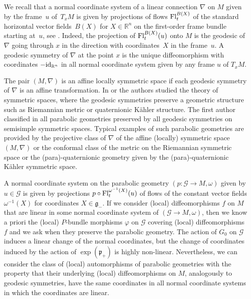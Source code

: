 \documentclass[pdftex]{sigma}
\newcommand{\om}{\omega}
\newcommand{\ba}{\mathcal{G}}
\newcommand{\va}{\varphi}
\newcommand{\fg}{\mathfrak g}
\newcommand{\fp}{\mathfrak p}
\newcommand{\Fl}{{\rm Fl}}
\newcommand{\id}{{\rm id}}
\numberwithin{equation}{section}
\begin{document}
We recall that a normal coordinate system of a linear connection $\nabla$ on $M$ given by the frame~$u$ of~$T_xM$ is given by projections of f\/lows $\Fl_t^{B(X)}$ of the standard horizontal vector f\/ields~$B(X)$ for $X\in \mathbb{R}^n$ on the f\/irst-order frame bundle starting at~$u$, see \cite[Section~III.8]{KoNo}. Indeed, the projection of $\Fl_t^{B(X)}(u)$ onto $M$ is the geodesic of $\nabla$ going through $x$ in the direction with coordina\-tes~$X$ in the frame~$u$. A geodesic symmetry of $\nabla$ at the point $x$ is the unique dif\/feomorphism with coordinates $-\id_{\mathbb{R}^n}$ in all normal coordinate system given by any frame $u$ of $T_xM$.

The pair $(M,\nabla)$ is an af\/f\/ine locally symmetric space if each geodesic symmetry of $\nabla$ is an af\/f\/ine transformation.
In \cite{Helgason} or \cite{Besse} the authors studied the theory of symmetric spaces, where the geodesic symmetries preserve a geometric structure such as Riemannian metric or quaternionic K\"ahler structure. The f\/irst author classif\/ied in \cite{G3} all parabolic geometries preserved by all geodesic symmetries on semisimple symmetric spaces. Typical examples of such parabolic geometries are provided by the projective class of $\nabla$ of the af\/f\/ine (locally) symmetric space $(M,\nabla)$ or the conformal class of the metric on the Riemannian symmetric space or the (para)-quaternionic geometry given by the (para)-quaternionic K\"ahler symmetric space.

A normal coordinate system on the parabolic geometry $(p\colon \ba\to M,\om)$ given by $u\in \ba$ is given by projections $p\circ \Fl_t^{\om^{-1}(X)}(u)$ of f\/lows of the constant vector f\/ields $\om^{-1}(X)$ for coordinates $X\in \fg_-$. If we consider (local) dif\/feomorphisms $f$ on $M$ that are linear in some normal coordinate system of $(\ba\to M,\om)$, then we know a priori the (local) $P$-bundle morphisms $\va$ on $\ba$ covering (local) dif\/feomorphisms~$f$ and we ask when they preserve the parabolic geometry. The action of $G_0$ on $\ba$ induces a linear change of the normal coordinates, but the change of coordinates induced by the action of $\exp(\fp_+)$ is highly non-linear. Nevertheless, we can consider the class of (local) automorphisms of parabolic geometries with the property that their underlying (local) dif\/feomorphisms on $M$, analogously to geodesic symmetries, have the same coordinates in all normal coordinate systems in which the coordinates are linear.
\end{document}
